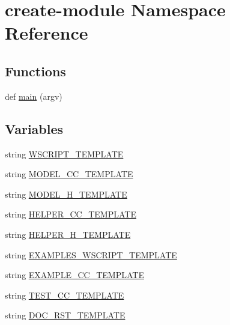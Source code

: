 \hypertarget{namespacecreate-module}{}\section{create-\/module Namespace Reference}
\label{namespacecreate-module}
\subsection*{Functions}
\begin{DoxyCompactItemize}
\item 
def \hyperlink{namespacecreate-module_a293e91dd0a44f4845da45a092e947974}{main} (argv)
\end{DoxyCompactItemize}
\subsection*{Variables}
\begin{DoxyCompactItemize}
\item 
string \hyperlink{namespacecreate-module_aef22727f8a119447d4829afdcccdea22}{W\+S\+C\+R\+I\+P\+T\+\_\+\+T\+E\+M\+P\+L\+A\+TE}
\item 
string \hyperlink{namespacecreate-module_a992dfc57cde92a96351e12d640f7be2d}{M\+O\+D\+E\+L\+\_\+\+C\+C\+\_\+\+T\+E\+M\+P\+L\+A\+TE}
\item 
string \hyperlink{namespacecreate-module_a99886e8cbcd240dcaeb7ca65566cdbe6}{M\+O\+D\+E\+L\+\_\+\+H\+\_\+\+T\+E\+M\+P\+L\+A\+TE}
\item 
string \hyperlink{namespacecreate-module_a4482926e9b75454a934c5dbfce4c7f0e}{H\+E\+L\+P\+E\+R\+\_\+\+C\+C\+\_\+\+T\+E\+M\+P\+L\+A\+TE}
\item 
string \hyperlink{namespacecreate-module_a3c745bb622340458336d4c27bd054465}{H\+E\+L\+P\+E\+R\+\_\+\+H\+\_\+\+T\+E\+M\+P\+L\+A\+TE}
\item 
string \hyperlink{namespacecreate-module_a4d78d45f600aab71771019e9e66a321f}{E\+X\+A\+M\+P\+L\+E\+S\+\_\+\+W\+S\+C\+R\+I\+P\+T\+\_\+\+T\+E\+M\+P\+L\+A\+TE}
\item 
string \hyperlink{namespacecreate-module_a969d5fe5f908bb860dd51f921435e8a9}{E\+X\+A\+M\+P\+L\+E\+\_\+\+C\+C\+\_\+\+T\+E\+M\+P\+L\+A\+TE}
\item 
string \hyperlink{namespacecreate-module_a0d5b7c6f3becb0800ddaf6c1e5d7a0e5}{T\+E\+S\+T\+\_\+\+C\+C\+\_\+\+T\+E\+M\+P\+L\+A\+TE}
\item 
string \hyperlink{namespacecreate-module_aa462227e0236ab55cb3474b007e28cff}{D\+O\+C\+\_\+\+R\+S\+T\+\_\+\+T\+E\+M\+P\+L\+A\+TE}
\end{DoxyCompactItemize}


